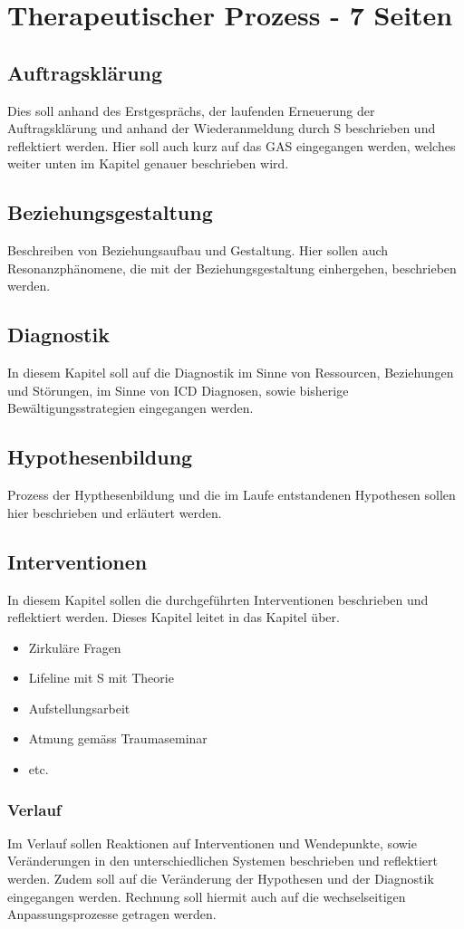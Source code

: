 \section{Therapeutischer Prozess - 7 Seiten}\label{Prozess}
\subsection{Auftragsklärung} Dies soll anhand des Erstgesprächs, der laufenden Erneuerung der Auftragsklärung und anhand der Wiederanmeldung durch S beschrieben und reflektiert werden. Hier soll auch kurz auf das GAS eingegangen werden, welches weiter unten im Kapitel  	genauer beschrieben wird. 
\subsection{Beziehungsgestaltung} Beschreiben von Beziehungsaufbau und Gestaltung. Hier sollen auch Resonanzphänomene, die mit der Beziehungsgestaltung einhergehen, beschrieben werden. 
\subsection{Diagnostik} In diesem Kapitel soll auf die Diagnostik im Sinne von   Ressourcen, Beziehungen und Störungen, im Sinne von ICD Diagnosen, sowie bisherige Bewältigungsstrategien eingegangen werden. 
\subsection{Hypothesenbildung} Prozess der Hypthesenbildung und die im Laufe entstandenen Hypothesen sollen hier beschrieben und erläutert werden. 
\subsection{Interventionen} In diesem Kapitel sollen die durchgeführten Interventionen beschrieben und reflektiert werden. Dieses Kapitel leitet in das Kapitel  über.
\begin{itemize}
 \item Zirkuläre Fragen
 \item Lifeline mit S mit Theorie
 \item Aufstellungsarbeit
 \item Atmung gemäss Traumaseminar
 \item etc.
\end{itemize}
\subsubsection{Verlauf}\label{Verlauf} Im Verlauf sollen Reaktionen auf Interventionen und Wendepunkte, sowie Veränderungen in den unterschiedlichen Systemen beschrieben und reflektiert werden. Zudem soll auf die Veränderung der Hypothesen und der Diagnostik eingegangen werden. Rechnung soll hiermit auch auf die wechselseitigen Anpassungsprozesse getragen werden.

